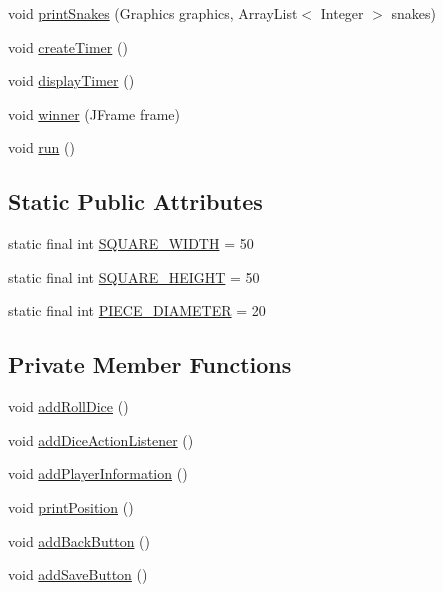 \begin{DoxyCompactItemize}
\item 
void \hyperlink{class_display_1_1_display_sn_l_ac8d66280626ecf00242f63c0536a144c}{print\+Snakes} (Graphics graphics, Array\+List$<$ Integer $>$ snakes)
\item 
void \hyperlink{class_display_1_1_display_sn_l_a598acd47dc6015f619cc5d89265de10b}{create\+Timer} ()
\item 
void \hyperlink{class_display_1_1_display_sn_l_ab526b124e8678ad26b6ad9c759cdd5d2}{display\+Timer} ()
\item 
void \hyperlink{class_display_1_1_display_sn_l_a232e567bedf12094d4625d6134ff768a}{winner} (J\+Frame frame)
\item 
void \hyperlink{class_display_1_1_display_sn_l_ac95a51c4b09908fc635f2d97fd012ce1}{run} ()
\end{DoxyCompactItemize}
\subsection*{Static Public Attributes}
\begin{DoxyCompactItemize}
\item 
static final int \hyperlink{class_display_1_1_display_sn_l_acac8d594916c09aae69657f94c3e766d}{S\+Q\+U\+A\+R\+E\+\_\+\+W\+I\+D\+T\+H} = 50
\item 
static final int \hyperlink{class_display_1_1_display_sn_l_abcf7150eb19d813f34a1cdd3708d5c83}{S\+Q\+U\+A\+R\+E\+\_\+\+H\+E\+I\+G\+H\+T} = 50
\item 
static final int \hyperlink{class_display_1_1_display_sn_l_ac8f487404183209a60d90af4124eb61c}{P\+I\+E\+C\+E\+\_\+\+D\+I\+A\+M\+E\+T\+E\+R} = 20
\end{DoxyCompactItemize}
\subsection*{Private Member Functions}
\begin{DoxyCompactItemize}
\item 
void \hyperlink{class_display_1_1_display_sn_l_a0a2baf23a90b4ed76b05ef06f5487016}{add\+Roll\+Dice} ()
\item 
void \hyperlink{class_display_1_1_display_sn_l_ab16ef5ed048c34ce2f2973caa9fe2461}{add\+Dice\+Action\+Listener} ()
\item 
void \hyperlink{class_display_1_1_display_sn_l_a1034e2f5f20ba38c25f5b321797f279f}{add\+Player\+Information} ()
\item 
void \hyperlink{class_display_1_1_display_sn_l_a8c5818de472e1cbb43e489bc52f6d5ee}{print\+Position} ()
\item 
void \hyperlink{class_display_1_1_display_sn_l_a5c2c2ebf9f618d9ceaec463352a3a4ff}{add\+Back\+Button} ()
\item 
void \hyperlink{class_display_1_1_display_sn_l_a1b9d580e89e9460efdbe333f8ba849b3}{add\+Save\+Button} ()
\end{DoxyCompactItemize}

